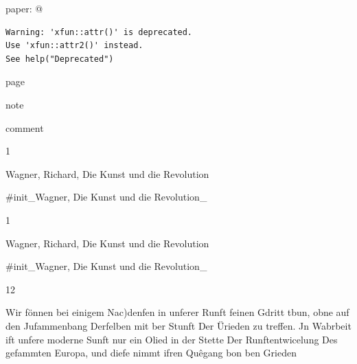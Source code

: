\documentclass[
  letterpaper,
  DIV=11,
  numbers=noendperiod]{scrartcl}
\begin{document}
paper: @

\begin{verbatim}
Warning: 'xfun::attr()' is deprecated.
Use 'xfun::attr2()' instead.
See help("Deprecated")
\end{verbatim}

page

note

comment

1

Wagner, Richard, Die Kunst und die Revolution

\#init\_Wagner, Die Kunst und die Revolution\_

1

Wagner, Richard, Die Kunst und die Revolution

\#init\_Wagner, Die Kunst und die Revolution\_

12

Wir fönnen bei einigem Nac)denfen in unferer Runft feinen Gdritt tbun,
obne auf den Jufammenbang Derfelben mit ber Stunft Der Ürieden zu
treffen. Jn Wabrbeit ift unfere moderne Sunft nur ein Olied in der
Stette Der Runftentwicelung Des gefammten Europa, und diefe nimmt ifren
Quêgang bon ben Grieden
\end{document}
